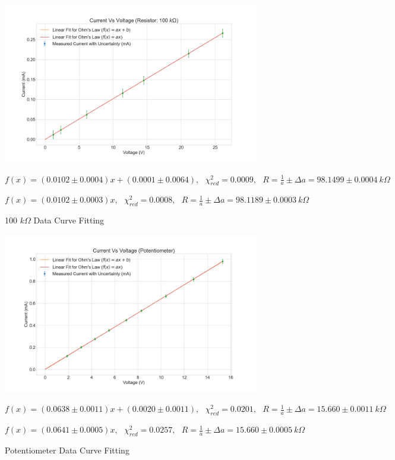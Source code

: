 \documentclass[letterpaper,12pt]{article}
\begin{document}
\begin{figure}[H]
  \centering
  \includegraphics[width=0.95\linewidth]{../Exercise1/lab_1_ex_1_plot_100k.png}   
  \begin{center}
    $f(x) = (0.0102 \pm 0.0004) x + (0.0001 \pm 0.0064),\ \ \ \chi^2_{red} = 0.0009,\ \ \ R = \frac{1}{a}\pm \Delta a = 98.1499 \pm 0.0004 \ k\Omega $
    
    $f(x) = (0.0102 \pm 0.0003) x,\ \ \ \chi^2_{red} = 0.0008,\ \ \ R = \frac{1}{a}\pm \Delta a = 98.1189 \pm 0.0003 \ k\Omega $
    
  \end{center}  
  \caption{100 $k\Omega$ Data Curve Fitting}
  \label{100k-curve-fit}
\end{figure}


\begin{figure}[H]
  \centering
  \includegraphics[width=0.95\linewidth]{../Exercise1/lab_1_ex_1_plot_potentiometer.png}   
  \begin{center}
    $f(x) = (0.0638 \pm 0.0011) x + (0.0020 \pm 0.0011),\ \ \ \chi^2_{red} = 0.0201,\ \ \ R = \frac{1}{a} \pm \Delta a= 15.660 \pm 0.0011  \ k\Omega $
    
    $f(x) = (0.0641 \pm 0.0005) x,\ \ \ \chi^2_{red} = 0.0257,\ \ \ R = \frac{1}{a}\pm \Delta a = 15.660 \pm 0.0005 \ k\Omega $
    
  \end{center}  
  \caption{Potentiometer Data Curve Fitting}
  \label{potentiometer-curve-fit}
\end{figure}
\end{document}
